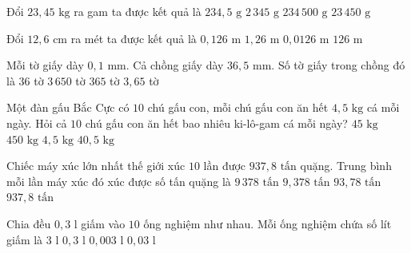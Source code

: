 \begin{ex} %
Đổi $23{,}45\text{ kg}$ ra gam ta được kết quả là
\choice
{$234{,}5\text{ g}$}
{$2\,345\text{ g}$}
{$234\,500\text{ g}$}
{\True $23\,450\text{ g}$}
\end{ex}

\begin{ex} %
Đổi $12{,}6\text{ cm}$ ra mét ta được kết quả là
\choice
{\True $0{,}126\text{ m}$}
{$1{,}26\text{ m}$}
{$0{,}0126\text{ m}$}
{$126\text{ m}$}
\end{ex}

\begin{ex} %
Mỗi tờ giấy dày $0{,}1\text{ mm}$. Cả chồng giấy dày $36{,}5\text{ mm}$. Số tờ giấy trong chồng đó là
\choice
{$36$ tờ}
{$3\,650$ tờ}
{\True $365$ tờ}
{$3{,}65$ tờ}
\end{ex}

\begin{ex} %
Một đàn gấu Bắc Cực có $10$ chú gấu con, mỗi chú gấu con ăn hết $4{,}5\text{ kg}$ cá mỗi ngày. Hỏi cả $10$ chú gấu con ăn hết bao nhiêu ki-lô-gam cá mỗi ngày?
\choice
{\True $45\text{ kg}$}
{$450\text{ kg}$}
{$4{,}5\text{ kg}$}
{$40{,}5\text{ kg}$}
\end{ex}

\begin{ex} %
Chiếc máy xúc lớn nhất thế giới xúc $10$ lần được $937{,}8\text{ tấn}$ quặng. Trung bình mỗi lần máy xúc đó xúc được số tấn quặng là
\choice
{$9\,378\text{ tấn}$}
{$9{,}378\text{ tấn}$}
{\True $93{,}78\text{ tấn}$}
{$937{,}8\text{ tấn}$}
\end{ex}

\begin{ex} %
Chia đều $0{,}3\text{ l}$ giấm vào $10$ ống nghiệm như nhau. Mỗi ống nghiệm chứa số lít giấm là
\choice
{$3\text{ l}$}
{$0{,}3\text{ l}$}
{$0{,}003\text{ l}$}
{\True $0{,}03\text{ l}$}
\end{ex}

